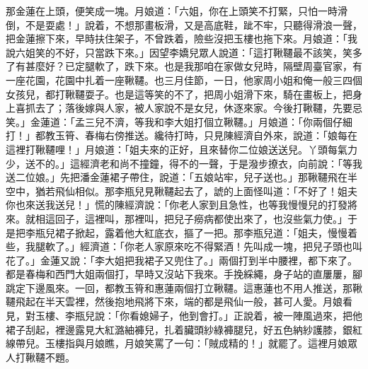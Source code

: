 \begin{showcontents}{}
那金蓮在上頭，便笑成一塊。月娘道：「六姐，你在上頭笑不打緊，只怕一時滑倒，不是耍處！」說着，不想那畫板滑，又是高底鞋，跐不牢，只聽得滑浪一聲，把金蓮擦下來，早時扶住架子，不曾跌着，險些沒把玉樓也拖下來。月娘道：「我說六姐笑的不好，只當跌下來。」因望李嬌兒眾人說道：「這打鞦韆最不該笑，笑多了有甚麼好？已定腿軟了，跌下來。也是我那咱在家做女兒時，隔壁周臺官家，有一座花園，花園中扎着一座鞦韆。也三月佳節，一日，他家周小姐和俺一般三四個女孩兒，都打鞦韆耍子。也是這等笑的不了，把周小姐滑下來，騎在畫板上，把身上喜抓去了；落後嫁與人家，被人家說不是女兒，休逐來家。今後打鞦韆，先要忌笑。」金蓮道：「孟三兒不濟，等我和李大姐打個立鞦韆。」月娘道：「你兩個仔細打！」都教玉筲、春梅右傍推送。纔待打時，只見陳經濟自外來，說道：「娘每在這裡打鞦韆哩！」月娘道：「姐夫來的正好，且來替你二位娘送送兒。丫頭每氣力少，送不的。」這經濟老和尚不撞鐘，得不的一聲，于是潑步撩衣，向前說：「等我送二位娘。」先把潘金蓮裙子帶住，說道：「五娘站牢，兒子送也。」那鞦韆飛在半空中，猶若飛仙相似。那李瓶兒見鞦韆起去了，諕的上面怪叫道：「不好了！姐夫你也來送我送兒！」慌的陳經濟說：「你老人家到且急性，也等我慢慢兒的打發將來。就相這回子，這裡叫，那裡叫，把兒子癆病都使出來了，也沒些氣力使。」于是把李瓶兒裙子掀起，露着他大紅底衣，摳了一把。那李瓶兒道：「姐夫，慢慢着些，我腿軟了。」經濟道：「你老人家原來吃不得緊酒！先叫成一塊，把兒子頭也叫花了。」金蓮又說：「李大姐把我裙子又兜住了。」兩個打到半中腰裡，都下來了。都是春梅和西門大姐兩個打，早時又沒站下我來。手挽綵繩，身子站的直屢屢，腳跳定下邊風來。一回，都教玉筲和惠蓮兩個打立鞦韆。這惠蓮也不用人推送，那鞦韆飛起在半天雲裡，然後抱地飛將下來，端的都是飛仙一般，甚可人愛。月娘看見，對玉樓、李瓶兒說：「你看媳婦子，他到會打。」正說着，被一陣風過來，把他裙子刮起，裡邊露見大紅潞紬褲兒，扎着臟頭紗綠褲腿兒，好五色納紗護膝，銀紅線帶兒。玉樓指與月娘瞧，月娘笑罵了一句：「賊成精的！」就罷了。這裡月娘眾人打鞦韆不題。


\end{showcontents}
